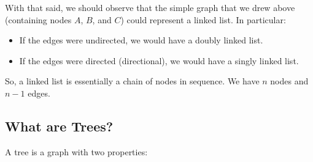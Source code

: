 \documentclass[letterpaper]{article}
\begin{document}
With that said, we should observe that the simple graph that we drew above (containing nodes $A$, $B$, and $C$) could represent a linked list. In particular: 
\begin{itemize}
    \item If the edges were undirected, we would have a doubly linked list. 
    \item If the edges were directed (directional), we would have a singly linked list. 
\end{itemize}
So, a linked list is essentially a chain of nodes in sequence. We have $n$ nodes and $n - 1$ edges. 

\subsection{What are Trees?}
A tree is a graph with two properties: 
\end{document}
